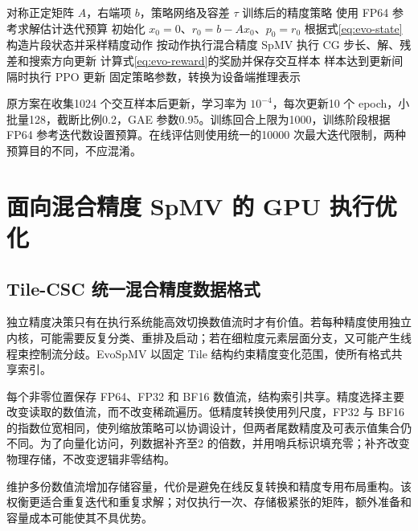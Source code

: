 \begin{algorithm}[htbp]\caption{EvoCG 策略训练的求解器交互过程}\label{alg:evo-train}
\begin{algorithmic}[1]
\REQUIRE 对称正定矩阵 $A$，右端项 $b$，策略网络及容差 $\tau$
\ENSURE 训练后的精度策略
\STATE 使用 FP64 参考求解估计迭代预算
\STATE 初始化 $x_0=0$、$r_0=b-Ax_0$、$p_0=r_0$
\STATE 根据式\eqref{eq:evo-state}构造片段状态并采样精度动作
\STATE 按动作执行混合精度 SpMV
\STATE 执行 CG 步长、解、残差和搜索方向更新
\STATE 计算式\eqref{eq:evo-reward}的奖励并保存交互样本
\STATE 样本达到更新间隔时执行 PPO 更新
\ENDWHILE
\ENDFOR
\STATE 固定策略参数，转换为设备端推理表示
\end{algorithmic}\end{algorithm}

原方案在收集1024 个交互样本后更新，学习率为 $10^{-4}$，每次更新10 个 epoch，小批量128，截断比例0.2，GAE 参数0.95。训练回合上限为1000，训练阶段根据 FP64 参考迭代数设置预算。在线评估则使用统一的10000 次最大迭代限制，两种预算目的不同，不应混淆。

\section{面向混合精度 SpMV 的 GPU 执行优化}
\subsection{Tile-CSC 统一混合精度数据格式}
独立精度决策只有在执行系统能高效切换数值流时才有价值。若每种精度使用独立内核，可能需要反复分类、重排及启动；若在细粒度元素层面分支，又可能产生线程束控制流分歧。EvoSpMV 以固定 Tile 结构约束精度变化范围，使所有格式共享索引。
\clearpage
{}


每个非零位置保存 FP64、FP32 和 BF16 数值流，结构索引共享。精度选择主要改变读取的数值流，而不改变稀疏遍历。低精度转换使用列尺度，FP32 与 BF16 的指数位宽相同，使列缩放策略可以协调设计，但两者尾数精度及可表示值集合仍不同。为了向量化访问，列数据补齐至2 的倍数，并用哨兵标识填充零；补齐改变物理存储，不改变逻辑非零结构。

维护多份数值流增加存储容量，代价是避免在线反复转换和精度专用布局重构。该权衡更适合重复迭代和重复求解；对仅执行一次、存储极紧张的矩阵，额外准备和容量成本可能使其不具优势。

